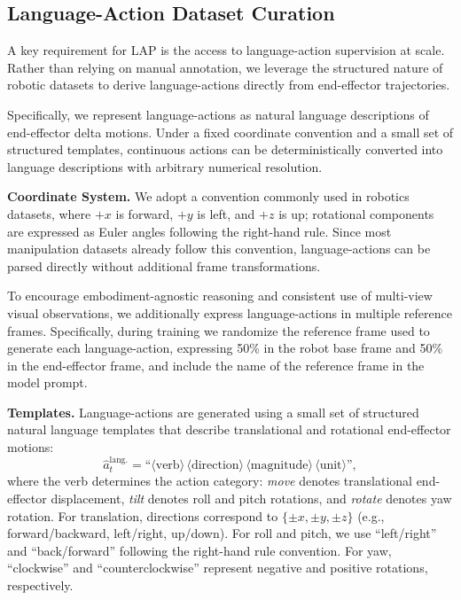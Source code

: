 \subsection{Language-Action Dataset Curation}
\label{subsec:curation}

A key requirement for LAP is the access to language-action supervision at scale. Rather than relying on manual annotation, we leverage the structured nature of robotic datasets to derive language-actions directly from end-effector trajectories.

Specifically, we represent language-actions as natural language descriptions of end-effector delta motions. Under a fixed coordinate convention and a small set of structured templates, continuous actions can be deterministically converted into language descriptions with arbitrary numerical resolution.

\noindent\textbf{Coordinate System.}
We adopt a convention commonly used in robotics datasets, where $+x$ is forward, $+y$ is left, and $+z$ is up; rotational components are expressed as Euler angles following the right-hand rule. Since most manipulation datasets already follow this convention, language-actions can be parsed directly without additional frame transformations. 

To encourage embodiment-agnostic reasoning and consistent use of multi-view visual observations, we additionally express language-actions in multiple reference frames. Specifically, during training we randomize the reference frame used to generate each language-action, expressing 50\% in the robot base frame and 50\% in the end-effector frame, and include the name of the reference frame in the model prompt. 

\noindent\textbf{Templates.}
Language-actions are generated using a small set of structured natural language templates that describe translational and rotational end-effector motions:
\begin{equation}
\hat{a}_t^{\text{lang.}}
=
\text{``}\langle\text{verb}\rangle\,
\langle\text{direction}\rangle\,
\langle\text{magnitude}\rangle\,
\langle\text{unit}\rangle\text{''},
\end{equation}
where the verb determines the action category: \emph{move} denotes translational end-effector displacement, \emph{tilt} denotes roll and pitch rotations, and \emph{rotate} denotes yaw rotation. For translation, directions correspond to $\{\pm x, \pm y, \pm z\}$ (e.g., forward/backward, left/right, up/down). For roll and pitch, we use ``left/right'' and ``back/forward'' following the right-hand rule convention. For yaw, ``clockwise'' and ``counterclockwise'' represent negative and positive rotations, respectively.


